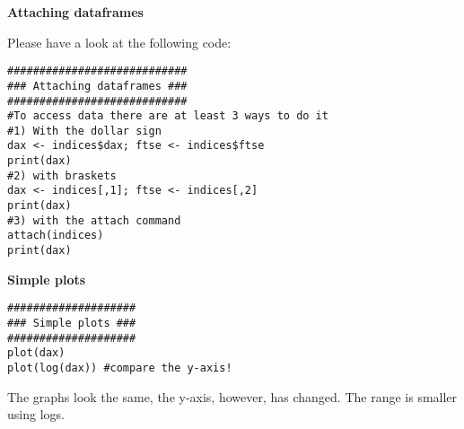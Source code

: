 \begin{Solution}{3.2}
\textbf{Attaching dataframes}

Please have a look at the following code:
\begin{verbatim}
############################
### Attaching dataframes ###
############################
#To access data there are at least 3 ways to do it
#1) With the dollar sign
dax <- indices$dax; ftse <- indices$ftse
print(dax)
#2) with braskets
dax <- indices[,1]; ftse <- indices[,2]
print(dax)
#3) with the attach command
attach(indices)
print(dax)
\end{verbatim}
\end{Solution}
\begin{Solution}{3.3}
\textbf{Simple plots }

\begin{verbatim}
####################
### Simple plots ###
####################
plot(dax)
plot(log(dax)) #compare the y-axis!
\end{verbatim}
The graphs look the same, the y-axis, however, has changed. The range is smaller using logs.
\end{Solution}
